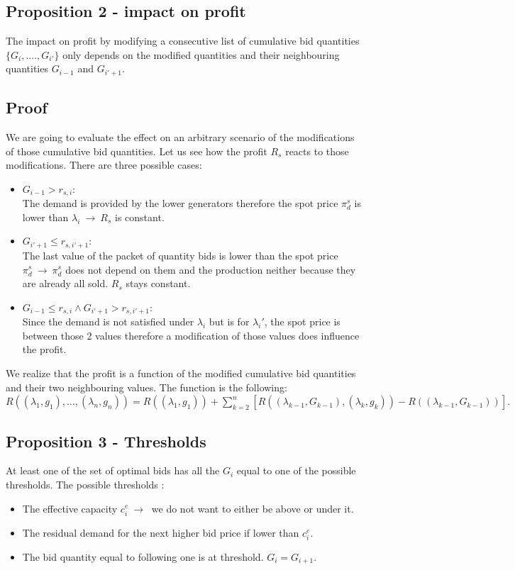 \documentclass[letterpaper]{article}
\begin{document}
\subsection{Proposition 2 - impact on profit}
The impact on profit by modifying a consecutive list of cumulative bid quantities $\{G_i, ...., G_{i'} \}$ only depends on the modified quantities and their neighbouring quantities $G_{i-1}$ and $G_{i'+1}$.
\subsection{Proof}
We are going to evaluate the effect on an arbitrary scenario of the modifications of those cumulative bid quantities. Let us see how the profit $R_s$ reacts to those modifications. There are three possible cases:\\
\begin{itemize}
\item $G_{i-1} > r_{s,i}$: \\
The demand is provided by the lower generators therefore the spot price $\pi_d^s$ is lower than $\lambda_i \ \rightarrow \ R_s$ is constant.
\item $G_{i'+1} \le r_{s,i'+1}$: \\
The last value of the packet of quantity bids is lower than the spot price $\pi_d^s \ \rightarrow \ \pi_d^s$ does not depend on them and the production neither because they are already all sold. $R_s$ stays constant.
\item $G_{i-1} \le r_{s,i} \wedge G_{i'+1} > r_{s,i'+1}$: \\
Since the demand is not satisfied under $\lambda_i$ but is for $\lambda_i'$, the spot price is between those 2 values therefore a modification of those values does influence the profit.
\end{itemize}
We realize that the profit is a function of the modified cumulative bid quantities and their two neighbouring values. The function is the following: \\
\(\displaystyle R\left( (\lambda_1, g_1), \ldots, (\lambda_n, g_n) \right) =
R\left( (\lambda_1, g_1) \right) +
\sum_{k=2}^n \left[ R\left( (\lambda_{k-1}, G_{k-1}), (\lambda_k, g_k) \right) -
R\left( (\lambda_{k-1}, G_{k-1}) \right) \right].\) 
\subsection{Proposition 3 - Thresholds}
At least one of the set of optimal bids has all the $G_i$ equal to one of the possible thresholds.
The possible thresholds : \\
\begin{itemize}
\item The effective capacity $c_i^e \ \rightarrow \ $ we do not want to either be above or under it.
\item The residual demand for the next higher bid price if lower than $c_i^e$.
\item The bid quantity equal to following one is at threshold. $G_i = G_{i+1}$.
\end{itemize}
\end{document}
